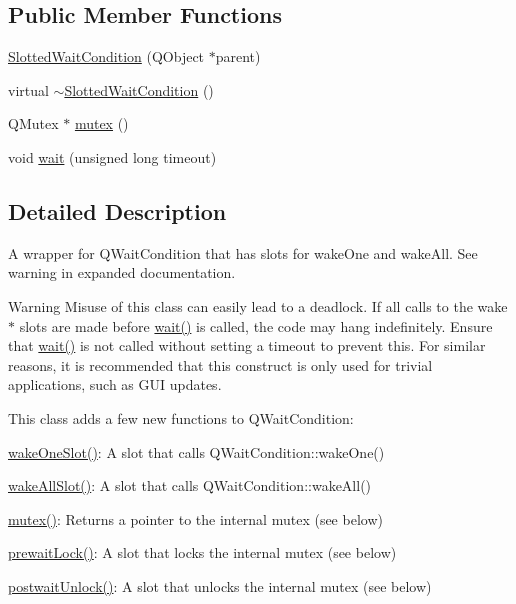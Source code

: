 \subsection*{Public Member Functions}
\begin{DoxyCompactItemize}
\item 
\hyperlink{classGlobalSearch_1_1SlottedWaitCondition_a4fd4c5343242d8961fd893012ba9f54b}{Slotted\+Wait\+Condition} (Q\+Object $\ast$parent)
\item 
virtual \hyperlink{classGlobalSearch_1_1SlottedWaitCondition_a5b504c643c03b6b9e2e30e4a7613f43c}{$\sim$\+Slotted\+Wait\+Condition} ()
\item 
Q\+Mutex $\ast$ \hyperlink{classGlobalSearch_1_1SlottedWaitCondition_af548d9a604d2ec84083e5c92ca1a3849}{mutex} ()
\item 
void \hyperlink{classGlobalSearch_1_1SlottedWaitCondition_a30999486ab4737cda3c4e93f8625ac1f}{wait} (unsigned long timeout)
\end{DoxyCompactItemize}


\subsection{Detailed Description}
A wrapper for Q\+Wait\+Condition that has slots for wake\+One and wake\+All. See warning in expanded documentation. 

\begin{DoxyWarning}{Warning}
Misuse of this class can easily lead to a deadlock. If all calls to the wake$\ast$ slots are made before \hyperlink{classGlobalSearch_1_1SlottedWaitCondition_a30999486ab4737cda3c4e93f8625ac1f}{wait()} is called, the code may hang indefinitely. Ensure that \hyperlink{classGlobalSearch_1_1SlottedWaitCondition_a30999486ab4737cda3c4e93f8625ac1f}{wait()} is not called without setting a timeout to prevent this. For similar reasons, it is recommended that this construct is only used for trivial applications, such as G\+U\+I updates.
\end{DoxyWarning}
This class adds a few new functions to Q\+Wait\+Condition\+:
\begin{DoxyItemize}
\item \hyperlink{classGlobalSearch_1_1SlottedWaitCondition_a26b060dde9c49345da5fe1c8dbd3374c}{wake\+One\+Slot()}\+: A slot that calls Q\+Wait\+Condition\+::wake\+One()
\item \hyperlink{classGlobalSearch_1_1SlottedWaitCondition_a4024066fe5db52f2e2c9257fcfbb5320}{wake\+All\+Slot()}\+: A slot that calls Q\+Wait\+Condition\+::wake\+All()
\item \hyperlink{classGlobalSearch_1_1SlottedWaitCondition_af548d9a604d2ec84083e5c92ca1a3849}{mutex()}\+: Returns a pointer to the internal mutex (see below)
\item \hyperlink{classGlobalSearch_1_1SlottedWaitCondition_afb1ba4315ffa2de59eaf5045d2a4c09f}{prewait\+Lock()}\+: A slot that locks the internal mutex (see below)
\item \hyperlink{classGlobalSearch_1_1SlottedWaitCondition_a3c9f9e3ba7eebdc3cc270445385e334c}{postwait\+Unlock()}\+: A slot that unlocks the internal mutex (see below)
\end{DoxyItemize}

